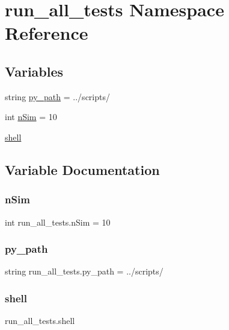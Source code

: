 \hypertarget{namespacerun__all__tests}{}\section{run\+\_\+all\+\_\+tests Namespace Reference}
\label{namespacerun__all__tests}
\subsection*{Variables}
\begin{DoxyCompactItemize}
\item 
string \hyperlink{namespacerun__all__tests_a49f08d67898b5f8be35797a490a2a540}{py\+\_\+path} = \textquotesingle{}../scripts/\textquotesingle{}
\item 
int \hyperlink{namespacerun__all__tests_a8eb4725e471ab55128564d69c7f58483}{n\+Sim} = 10
\item 
\hyperlink{namespacerun__all__tests_a53188ff486525d35e83f8124cc8474a3}{shell}
\end{DoxyCompactItemize}


\subsection{Variable Documentation}
\mbox{\label{namespacerun__all__tests_a8eb4725e471ab55128564d69c7f58483}} 
\subsubsection{\texorpdfstring{n\+Sim}{nSim}}
{\footnotesize\ttfamily int run\+\_\+all\+\_\+tests.\+n\+Sim = 10}

\mbox{\label{namespacerun__all__tests_a49f08d67898b5f8be35797a490a2a540}} 
\subsubsection{\texorpdfstring{py\+\_\+path}{py\_path}}
{\footnotesize\ttfamily string run\+\_\+all\+\_\+tests.\+py\+\_\+path = \textquotesingle{}../scripts/\textquotesingle{}}

\mbox{\label{namespacerun__all__tests_a53188ff486525d35e83f8124cc8474a3}} 
\subsubsection{\texorpdfstring{shell}{shell}}
{\footnotesize\ttfamily run\+\_\+all\+\_\+tests.\+shell}

